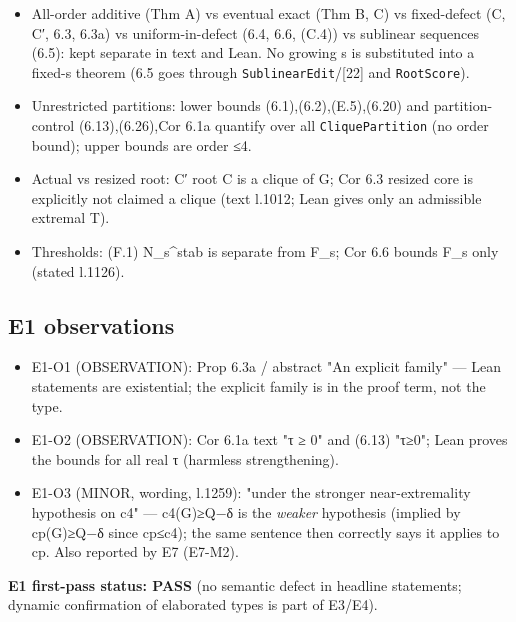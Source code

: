 \documentclass[
]{article}
\providecommand{\tightlist}{%
  \setlength{\itemsep}{0pt}\setlength{\parskip}{0pt}}
\begin{document}
\begin{itemize}
\tightlist
\item
  All-order additive (Thm A) vs eventual exact (Thm B, C) vs
  fixed-defect (C, C′, 6.3, 6.3a) vs uniform-in-defect (6.4, 6.6, (C.4))
  vs sublinear sequences (6.5): kept separate in text and Lean. No
  growing s is substituted into a fixed-s theorem (6.5 goes through
  \texttt{SublinearEdit}/{[}22{]} and \texttt{RootScore}).
\item
  Unrestricted partitions: lower bounds (6.1),(6.2),(E.5),(6.20) and
  partition-control (6.13),(6.26),Cor 6.1a quantify over all
  \texttt{CliquePartition} (no order bound); upper bounds are order ≤4.
\item
  Actual vs resized root: C′ root C is a clique of G; Cor 6.3 resized
  core is explicitly not claimed a clique (text l.1012; Lean gives only
  an admissible extremal T).
\item
  Thresholds: (F.1) N\_s\^{}stab is separate from F\_s; Cor 6.6 bounds
  F\_s only (stated l.1126).
\end{itemize}

\subsection{E1 observations}\label{e1-observations}

\begin{itemize}
\tightlist
\item
  E1-O1 (OBSERVATION): Prop 6.3a / abstract "An explicit family" ---
  Lean statements are existential; the explicit family is in the proof
  term, not the type.
\item
  E1-O2 (OBSERVATION): Cor 6.1a text "τ ≥ 0" and (6.13) "τ≥0"; Lean
  proves the bounds for all real τ (harmless strengthening).
\item
  E1-O3 (MINOR, wording, l.1259): "under the stronger near-extremality
  hypothesis on c4" --- c4(G)≥Q−δ is the \emph{weaker} hypothesis
  (implied by cp(G)≥Q−δ since cp≤c4); the same sentence then correctly
  says it applies to cp. Also reported by E7 (E7-M2).
\end{itemize}

\textbf{E1 first-pass status: PASS} (no semantic defect in headline
statements; dynamic confirmation of elaborated types is part of E3/E4).
\end{document}
